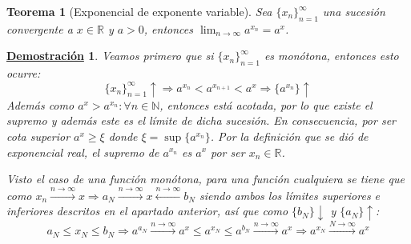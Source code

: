 \documentclass[10pt,a4paper,openright]{book}
\theoremstyle{break}
\newtheorem{theo}{Teorema}[chapter]
\newtheorem*{demo}{\underline{Demostración}}
\begin{document}
\begin{theo}[Exponencial de exponente variable]
Sea $\{x_n\}_{n=1}^\infty$ una sucesión convergente a $x\in \mathbb{R}$ y $a>0$, entonces $\lim_{n\rightarrow\infty} a^{x_n}=a^x$.
\end{theo}
\begin{demo}
Veamos primero que si $\{x_n\}_{n=1}^\infty$ es monótona, entonces esto ocurre:
$$\{x_n\}_{n=1}^\infty\uparrow\Rightarrow a^{x_n}<a^{x_{n+1}}<a^x \Rightarrow \{a^{x_n}\} \uparrow$$
Además como $a^x>a^{x_n}:\forall n\in \mathbb N$, entonces está acotada, por lo que existe el supremo y además este es el límite de dicha sucesión. En consecuencia, por ser cota superior $a^x\geq \xi$ donde $\xi=\sup\{a^{x_n}\}$. Por la definición que se dió de exponencial real, el supremo de $a^{x_n}$ es $a^x$ por ser $x_n\in \mathbb R$.

Visto el caso de una función monótona, para una función cualquiera se tiene que como $x_n\xrightarrow{n\rightarrow\infty} x\Rightarrow a_N\xrightarrow{n\rightarrow\infty}x\xleftarrow{n\rightarrow\infty} b_N$ siendo ambos los límites superiores e inferiores descritos en el apartado anterior, así que como $\{b_N\}\downarrow$ y $\{a_N\}\uparrow$:
$$a_N\leq x_N\leq b_N \Rightarrow a^{a_N}\xrightarrow{n\rightarrow\infty}a^x\leq a^{x_N}\leq a^{b_N}\xrightarrow{n\rightarrow\infty}a^x\Rightarrow a^{x_N}\xrightarrow{N\rightarrow\infty}a^x$$
\end{demo}
\end{document}

